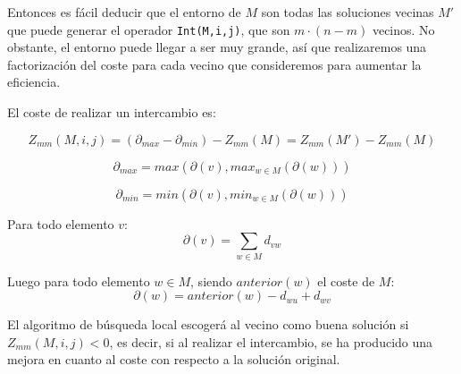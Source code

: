 \documentclass{article}
\begin{document}
    Entonces es fácil deducir que el entorno de $M$ son todas las soluciones vecinas $M'$ que puede generar
    el operador \texttt{Int(M,i,j)}, que son $m \cdot (n-m)$ vecinos. No obstante, el entorno puede llegar a ser muy grande,
    así que realizaremos una factorización del coste para cada vecino que consideremos para aumentar la eficiencia.

    El coste de realizar un intercambio es:
    
    \begin{equation*}
        Z_{mm}(M,i,j) = (\partial_{max} - \partial_{min}) - Z_{mm}(M) = Z_{mm}(M') - Z_{mm}(M)
    \end{equation*}

    \begin{equation*}
        \partial_{max} = max(\partial (v), max_{w \in M}(\partial (w)))
    \end{equation*}

    \begin{equation*}
        \partial_{min} = min(\partial (v), min_{w \in M}(\partial (w)))
    \end{equation*}

    Para todo elemento $v$:
    \begin{equation*}
        \partial (v) = \sum_{w \in M}d_{vw}
    \end{equation*}

    Luego para todo elemento $w \in M$, siendo $anterior(w)$ el coste de $M$:
    \begin{equation*}
        \partial (w) = anterior(w) - d_{wu} + d_{wv}
    \end{equation*}

    El algoritmo de búsqueda local escogerá al vecino como buena solución si $Z_{mm}(M,i,j) < 0$, es decir, si al
    realizar el intercambio, se ha producido una mejora en cuanto al coste con respecto a la solución original.

    \pagebreak
\end{document}
